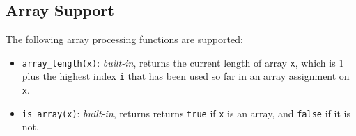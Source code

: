 \subsection*{Array Support}

The following array processing functions are supported:

\begin{itemize}
\item \lstinline{array_length(x)}: \textit{built-in}, returns
  the current length of array \lstinline{x}, which is 1 plus the
highest index \lstinline{i} that has been used so far in an array assignment on \lstinline{x}.
\item \lstinline{is_array(x)}: \textit{built-in}, returns
  returns \texttt{true} if \texttt{x} is an array, and \texttt{false} if it is not.
\end{itemize}

  


